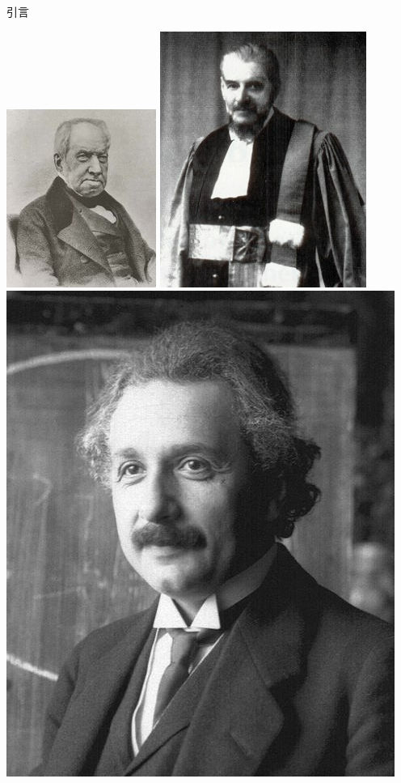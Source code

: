 \documentclass[t]{beamer}
\begin{document}
\begin{frame}{引言}
    \begin{center}
      \includegraphics[height=.35\textheight]{fig/brown.jpg} 
\includegraphics[height=.35\textheight]{fig/bachelier.jpg}
\includegraphics[height=.35\textheight]{fig/einstein.jpg}

\end{center}
\end{frame}
\end{document}
